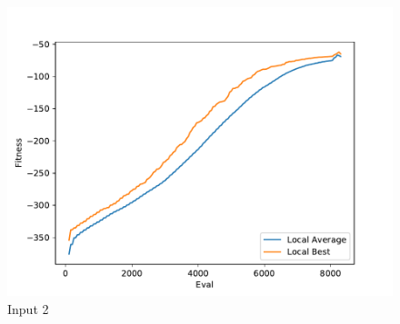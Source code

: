 \documentclass{standalone}
\begin{document}
\begin{figure}[!htb]
	\caption{Input 2}
	\label{fig:graph_2060}
	\includegraphics[width=\textwidth]{../graphs/graphs/2060.pdf}
\end{figure}
\end{document}
